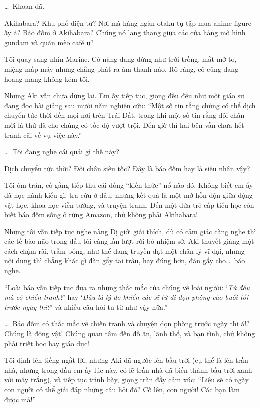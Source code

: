 \documentclass[../main.tex]{subfiles}
\begin{document}
\dots\ Khoan đã.

Akihabara? Khu phố điện tử? Nơi mà hàng ngàn otaku tụ tập mua anime figure ấy á? Báo đốm ở Akihabara? Chúng nó lang thang giữa các cửa hàng mô hình gundam và quán mèo café ư?

Tôi quay sang nhìn Marine. Cô nàng đang đứng như trời trồng, mắt mở to, miệng mấp máy nhưng chẳng phát ra âm thanh nào. Rõ ràng, cô cũng đang hoang mang không kém tôi.

Nhưng Aki vẫn chưa dừng lại. Em ấy tiếp tục, giọng đều đều như một giáo sư đang đọc bài giảng sau mười năm nghiên cứu: ``Một số tin rằng chúng có thể dịch chuyển tức thời đến mọi nơi trên Trái Đất, trong khi một số tin rằng đôi chân mới là thứ đã cho chúng có tốc độ vượt trội. Đến giờ thì hai bên vẫn chưa hết tranh cãi về vụ việc này.''

\dots\ Tôi đang nghe cái quái gì thế này?

Dịch chuyển tức thời? Đôi chân siêu tốc? Đây là báo đốm hay là siêu nhân vậy?

Tôi ôm trán, cố gắng tiếp thu cái đống ``kiến thức'' nổ não đó. Không biết em ấy đã học hành kiểu gì, tra cứu ở đâu, nhưng kết quả là một mớ hỗn độn giữa động vật học, khoa học viễn tưởng, và truyện tranh. Đến một đứa trẻ cấp tiểu học còn biết báo đốm sống ở rừng Amazon, chứ không phải Akihabara!

Nhưng tôi vẫn tiếp tục nghe nàng Dị giới giải thích, dù có cảm giác càng nghe thì các tế bào não trong đầu tôi càng lần lượt rời bỏ nhiệm sở. Aki thuyết giảng một cách chậm rãi, trầm bổng, như thể đang truyền đạt một chân lý vĩ đại, nhưng nội dung thì chẳng khác gì đàn gẩy tai trâu, hay đúng hơn, đàn gẩy cho\dots\ báo nghe.

``Loài báo vẫn tiếp tục đưa ra những thắc mắc của chúng về loài người: `\textit{Từ đâu mà có chiến tranh?}' hay `\textit{Đâu là lý do khiến các sĩ tử đi dọn phòng vào buổi tối trước ngày thi?}' và nhiều câu hỏi tu từ như vậy nữa.''

\dots\ Báo đốm có thắc mắc về chiến tranh và chuyện dọn phòng trước ngày thi á!? Chúng là động vật! Chúng quan tâm đến đồ ăn, lãnh thổ, và bạn tình, chứ không phải triết học hay giáo dục!

Tôi định lên tiếng ngắt lời, nhưng Aki đã ngước lên bầu trời (cụ thể là lên trần nhà, nhưng trong đầu em ấy lúc này, có lẽ trần nhà đã biến thành bầu trời xanh với mây trắng), và tiếp tục trình bày, giọng tràn đầy cảm xúc: ``Liệu sẽ có ngày con người có thể giải đáp những câu hỏi đó? Cố lên, con người! Các bạn làm được mà!''
\end{document}
